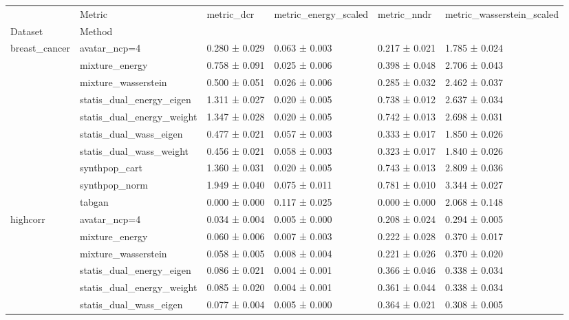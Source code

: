 \begin{tabular}{llllll}
\toprule
 & Metric & metric_dcr & metric_energy_scaled & metric_nndr & metric_wasserstein_scaled \\
Dataset & Method &  &  &  &  \\
\midrule
\multirow[t]{10}{*}{breast_cancer} & avatar_ncp=4 & 0.280 ± 0.029 & 0.063 ± 0.003 & 0.217 ± 0.021 & \cellcolor{mygreen}1.785 ± 0.024 \\
 & mixture_energy & 0.758 ± 0.091 & 0.025 ± 0.006 & 0.398 ± 0.048 & 2.706 ± 0.043 \\
 & mixture_wasserstein & 0.500 ± 0.051 & 0.026 ± 0.006 & 0.285 ± 0.032 & 2.462 ± 0.037 \\
 & statis_dual_energy_eigen & 1.311 ± 0.027 & \cellcolor{mygreen}0.020 ± 0.005 & 0.738 ± 0.012 & 2.637 ± 0.034 \\
 & statis_dual_energy_weight & 1.347 ± 0.028 & \cellcolor{mygreen}0.020 ± 0.005 & 0.742 ± 0.013 & 2.698 ± 0.031 \\
 & statis_dual_wass_eigen & 0.477 ± 0.021 & 0.057 ± 0.003 & 0.333 ± 0.017 & 1.850 ± 0.026 \\
 & statis_dual_wass_weight & 0.456 ± 0.021 & 0.058 ± 0.003 & 0.323 ± 0.017 & 1.840 ± 0.026 \\
 & synthpop_cart & 1.360 ± 0.031 & \cellcolor{mygreen}0.020 ± 0.005 & 0.743 ± 0.013 & 2.809 ± 0.036 \\
 & synthpop_norm & \cellcolor{myred}1.949 ± 0.040 & 0.075 ± 0.011 & \cellcolor{myred}0.781 ± 0.010 & \cellcolor{myred}3.344 ± 0.027 \\
 & tabgan & \cellcolor{mygreen}0.000 ± 0.000 & \cellcolor{myred}0.117 ± 0.025 & \cellcolor{mygreen}0.000 ± 0.000 & 2.068 ± 0.148 \\
\cline{1-6}
\multirow[t]{10}{*}{highcorr} & avatar_ncp=4 & 0.034 ± 0.004 & 0.005 ± 0.000 & 0.208 ± 0.024 & \cellcolor{mygreen}0.294 ± 0.005 \\
 & mixture_energy & 0.060 ± 0.006 & 0.007 ± 0.003 & 0.222 ± 0.028 & 0.370 ± 0.017 \\
 & mixture_wasserstein & 0.058 ± 0.005 & 0.008 ± 0.004 & 0.221 ± 0.026 & 0.370 ± 0.020 \\
 & statis_dual_energy_eigen & 0.086 ± 0.021 & \cellcolor{mygreen}0.004 ± 0.001 & 0.366 ± 0.046 & 0.338 ± 0.034 \\
 & statis_dual_energy_weight & 0.085 ± 0.020 & \cellcolor{mygreen}0.004 ± 0.001 & 0.361 ± 0.044 & 0.338 ± 0.034 \\
 & statis_dual_wass_eigen & 0.077 ± 0.004 & 0.005 ± 0.000 & 0.364 ± 0.021 & 0.308 ± 0.005 \\

\end{tabular}
